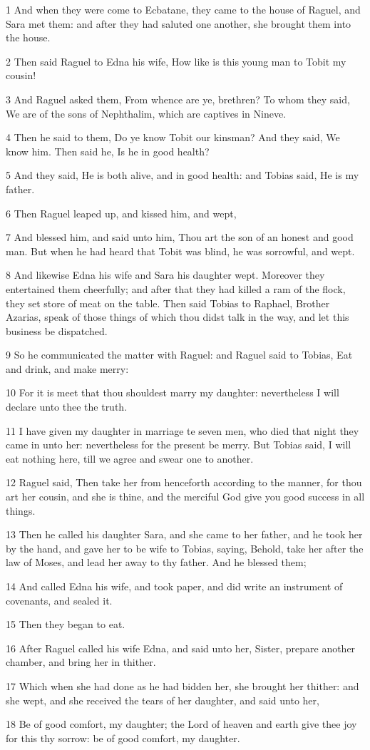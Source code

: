 \par 1 And when they were come to Ecbatane, they came to the house of Raguel, and Sara met them: and after they had saluted one another, she brought them into the house.
\par 2 Then said Raguel to Edna his wife, How like is this young man to Tobit my cousin!
\par 3 And Raguel asked them, From whence are ye, brethren? To whom they said, We are of the sons of Nephthalim, which are captives in Nineve.
\par 4 Then he said to them, Do ye know Tobit our kinsman? And they said, We know him. Then said he, Is he in good health?
\par 5 And they said, He is both alive, and in good health: and Tobias said, He is my father.
\par 6 Then Raguel leaped up, and kissed him, and wept,
\par 7 And blessed him, and said unto him, Thou art the son of an honest and good man. But when he had heard that Tobit was blind, he was sorrowful, and wept.
\par 8 And likewise Edna his wife and Sara his daughter wept. Moreover they entertained them cheerfully; and after that they had killed a ram of the flock, they set store of meat on the table. Then said Tobias to Raphael, Brother Azarias, speak of those things of which thou didst talk in the way, and let this business be dispatched.
\par 9 So he communicated the matter with Raguel: and Raguel said to Tobias, Eat and drink, and make merry:
\par 10 For it is meet that thou shouldest marry my daughter: nevertheless I will declare unto thee the truth.
\par 11 I have given my daughter in marriage te seven men, who died that night they came in unto her: nevertheless for the present be merry. But Tobias said, I will eat nothing here, till we agree and swear one to another.
\par 12 Raguel said, Then take her from henceforth according to the manner, for thou art her cousin, and she is thine, and the merciful God give you good success in all things.
\par 13 Then he called his daughter Sara, and she came to her father, and he took her by the hand, and gave her to be wife to Tobias, saying, Behold, take her after the law of Moses, and lead her away to thy father. And he blessed them;
\par 14 And called Edna his wife, and took paper, and did write an instrument of covenants, and sealed it.
\par 15 Then they began to eat.
\par 16 After Raguel called his wife Edna, and said unto her, Sister, prepare another chamber, and bring her in thither.
\par 17 Which when she had done as he had bidden her, she brought her thither: and she wept, and she received the tears of her daughter, and said unto her,
\par 18 Be of good comfort, my daughter; the Lord of heaven and earth give thee joy for this thy sorrow: be of good comfort, my daughter.


